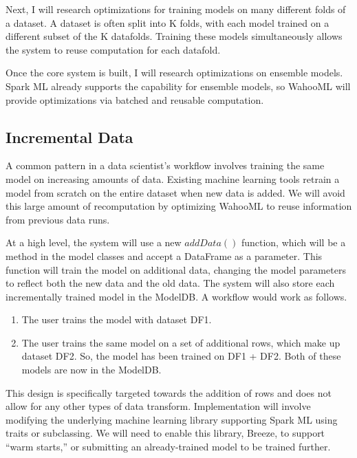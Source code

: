 \documentclass[../proposal.tex]{subfiles}
\begin{document}
Next, I will research optimizations for training models on many different folds
of a dataset. A dataset is often split into K folds, with each model trained on
a different subset of the K datafolds. Training these models simultaneously
allows the system to reuse computation for each datafold.

Once the core system is built, I will research optimizations on ensemble
models. Spark ML already supports the capability for ensemble models, so
WahooML will provide optimizations via batched and reusable computation.

\subsection{Incremental Data}

A common pattern in a data scientist's workflow involves training the same
model on increasing amounts of data. Existing machine learning tools retrain a
model from scratch on the entire dataset when new data is added. We will avoid
this large amount of recomputation by optimizing WahooML to reuse information
from previous data runs.

At a high level, the system will use a new $addData()$ function, which will be a method in the model classes and accept a DataFrame as a parameter. This function will train the model on additional data, changing the model parameters to reflect both the new data and the old data. The system will also store each incrementally trained model in the ModelDB. A workflow would work as follows.

\begin{enumerate}

\item The user trains the model with dataset DF1.

\item The user trains the same model on a set of additional rows, which make up dataset DF2. So, the model has been trained on DF1 + DF2. Both of these models are now in the ModelDB.

\end{enumerate}

This design is specifically targeted towards the addition of rows and does not
allow for any other types of data transform. Implementation will involve
modifying the underlying machine learning library supporting Spark ML using
traits or subclassing. We will need to enable this library, Breeze, to support
``warm starts,'' or submitting an already-trained model to be trained further.
\end{document}
